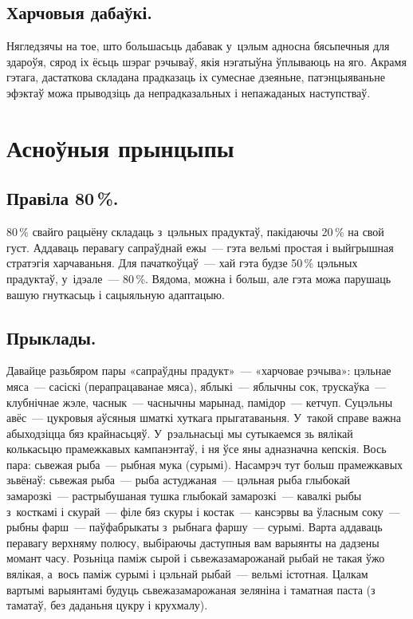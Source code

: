 \subsection{Харчовыя дабаўкі.}
Нягледзячы на тое, што большасьць дабавак у~цэлым адносна бясьпечныя для здароўя, сярод іх ёсьць шэраг рэчываў, якія нэгатыўна ўплываюць на яго. Акрамя гэтага, дастаткова складана прадказаць іх сумеснае дзеяньне, патэнцыяваньне эфэктаў можа прыводзіць да непрадказальных і непажаданых наступстваў.


\section{Асноўныя прынцыпы}

\subsection{Правіла 80\,\%.}
80\,\% свайго рацыёну складаць з~цэльных прадуктаў, пакідаючы 20\,\% на свой густ. Аддаваць перавагу сапраўднай ежы~--- гэта вельмі простая і выйгрышная стратэгія харчаваньня. Для пачаткоўцаў~--- хай гэта будзе 50\,\% цэльных прадуктаў, у~ідэале~--- 80\,\%. Вядома, можна і больш, але гэта можа парушаць вашую гнуткасьць і сацыяльную адаптацыю.

\subsection{Прыклады.}
Давайце разьбяром пары «сапраўдны прадукт»~--- «харчовае рэчыва»: цэльнае мяса~--- сасіскі (перапрацаванае мяса), яблыкі~--- яблычны сок, трускаўка~--- клубнічнае жэле, часнык~--- часнычны марынад, памідор~--- кетчуп. Суцэльны авёс~--- цукровыя аўсяныя шматкі хуткага прыгатаваньня. У~такой справе важна абыходзіцца бяз крайнасьцяў. У~рэальнасьці мы сутыкаемся зь вялікай колькасьцю прамежкавых кампанэнтаў, і ня ўсе яны адназначна кепскія. Вось пара: сьвежая рыба~--- рыбная мука (сурымі). Насамрэч тут больш прамежкавых зьвёнаў: сьвежая рыба~--- рыба астуджаная~--- цэльная рыба глыбокай замарозкі~--- растрыбушаная тушка глыбокай замарозкі~--- кавалкі рыбы з~косткамі і скурай~--- філе бяз скуры і костак~--- кансэрвы ва ўласным соку~--- рыбны фарш~--- паўфабрыкаты з~рыбнага фаршу~--- сурымі. Варта аддаваць перавагу верхняму полюсу, выбіраючы даступныя вам варыянты на дадзены момант часу. Розьніца паміж сырой і сьвежазамарожанай рыбай не такая ўжо вялікая, а~вось паміж сурымі і цэльнай рыбай~--- вельмі істотная. Цалкам вартымі варыянтамі будуць сьвежазамарожаная зеляніна і таматная паста (з таматаў, без даданьня цукру і крухмалу).


